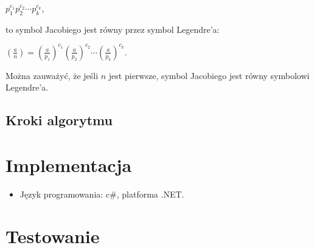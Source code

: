 \documentclass[a4paper,10pt]{article}
\begin{document}
 $p_1^{c_1}p_2^{c_2}\cdots p_k^{c_k}$,
 
 to symbol Jacobiego jest równy przez symbol Legendre'a:
 
 $\left( \frac a n \right) = \left( \frac a {p_1} \right)^{c_1} \left( \frac a {p_2} \right)^{c_2} \cdots \left( \frac a {p_k} \right)^{c_k}$.

 Można zauważyć, że jeśli $n$ jest pierwsze, symbol Jacobiego jest równy symbolowi Legendre'a.
 
 
 \subsection{Kroki algorytmu}
 


\section{Implementacja}
\begin{itemize}
 \item Język programowania: c\#, platforma  .NET.
\end{itemize}



\section{Testowanie}
\end{document}
